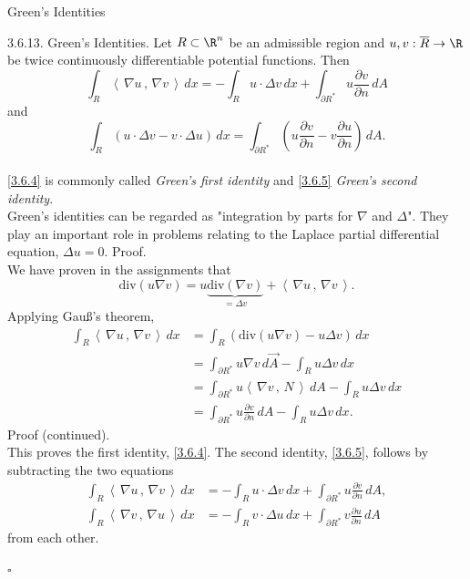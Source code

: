 \documentclass[smaller,hyperref={CJKbookmarks=true}]{beamer}
\newcommand{\scp}[2]{\left\langle\,#1\,,\,#2\,\right\rangle} \newcommand{\scpp}{\langle\,\cdot\,,\,\cdot\,\rangle}
\begin{document}
\begin{frame}{Green's Identities}
\begin{spacing}{1}
\alert{3.6.13. Green's Identities.} Let $R\subset\R^n$ be an admissible region and $u,v:\overline{R}\to\R$ be twice continuously dif{}ferentiable potential functions. Then
\begin{equation}\label{3.6.4}
  \int_R\scp{\nabla u}{\nabla v}\,dx=-\int_R u\cdot\Delta v\,dx+\int_{\partial R^*}u\frac{\partial v}{\partial n}\,dA
\end{equation}
and
\begin{equation}\label{3.6.5}
  \int_R(u\cdot\Delta v-v\cdot\Delta u)\,dx=\int_{\partial R^*}\left(u\frac{\partial v}{\partial n}-v\frac{\partial u}{\partial n}\right)\,dA.
\end{equation}
 \\[16pt]
\eqref{3.6.4} is commonly called \emph{Green's first identity} and \eqref{3.6.5} \emph{Green's second identity}.\\[9pt]
Green's identities can be regarded as "integration by parts for $\nabla$ and $\Delta$". They play an important role in problems relating to the Laplace partial
dif{}ferential equation, $\Delta u=0$.
\newpage
\alert{Proof.}\\ We have proven in the assignments that
\[\text{div}(u\nabla v)=u\underbrace{\text{div}(\nabla v)}_{=\Delta v}+\scp{\nabla u}{\nabla v}.\]
Applying Gau\ss's theorem,
\begin{equation*}
  \begin{split}
     \int_R\scp{\nabla u}{\nabla v}\,dx &=\int_R\left(\text{div}(u\nabla v)-u\Delta v\right)\,dx \\
       &=\int_{\partial R^*}u\nabla v\,d\vec{A}-\int_R u\Delta v\,dx  \\
       &=\int_{\partial R^*}u\scp{\nabla v}{N}\,dA-\int_R u\Delta v  \,dx \\
       &=\int_{\partial R^*}u\frac{\partial v}{\partial n}\,dA-\int_R u\Delta v\,dx.
       \end{split}
\end{equation*}
\newpage
\alert{Proof (continued).}\\
This proves the first identity, \eqref{3.6.4}. The second identity, \eqref{3.6.5}, follows by subtracting the two equations
\begin{align*}
  \int_R\scp{\nabla u}{\nabla v}\,dx &=-\int_Ru\cdot\Delta v\,dx+
  \int_{\partial R^*}u\frac{\partial v}{\partial n}\,dA, \\
  \int_R\scp{\nabla v}{\nabla u}\,dx &=-\int_Rv\cdot\Delta u\,dx+\int_{\partial R^*}v\frac{\partial u}{\partial n}\,dA
\end{align*}
from each other.
\begin{flushright}
  $\square$
\end{flushright}
\end{spacing}
\end{frame}
\end{document}
